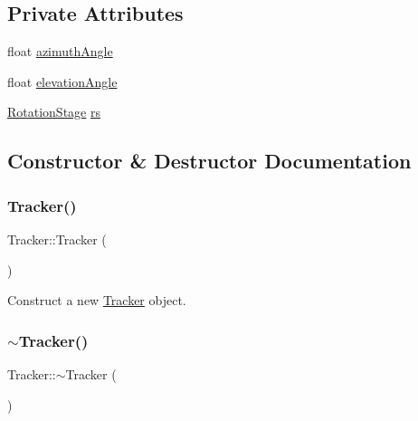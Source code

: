 \subsection*{Private Attributes}
\begin{DoxyCompactItemize}
\item 
float \hyperlink{class_tracker_abef36dbbea142e3f6e8fa599b03914e1}{azimuth\+Angle}
\item 
float \hyperlink{class_tracker_aed5b4c7d6d46607fefac6b1df2d41e18}{elevation\+Angle}
\item 
\hyperlink{class_rotation_stage}{Rotation\+Stage} \hyperlink{class_tracker_ad671e7016dce486eab4eb384d0443446}{rs}
\end{DoxyCompactItemize}


\subsection{Constructor \& Destructor Documentation}
\mbox{\label{class_tracker_adf214393a14e8bf23de2fc8231e239ec}} 
\subsubsection{\texorpdfstring{Tracker()}{Tracker()}}
{\footnotesize\ttfamily Tracker\+::\+Tracker (\begin{DoxyParamCaption}{ }\end{DoxyParamCaption})\hspace{0.3cm}{\ttfamily [inline]}}



Construct a new \hyperlink{class_tracker}{Tracker} object. 

\mbox{\label{class_tracker_a0ed1e23312cfe7fcfe5f2ac2abd69163}} 
\subsubsection{\texorpdfstring{$\sim$\+Tracker()}{~Tracker()}}
{\footnotesize\ttfamily Tracker\+::$\sim$\+Tracker (\begin{DoxyParamCaption}{ }\end{DoxyParamCaption})\hspace{0.3cm}{\ttfamily [inline]}}



